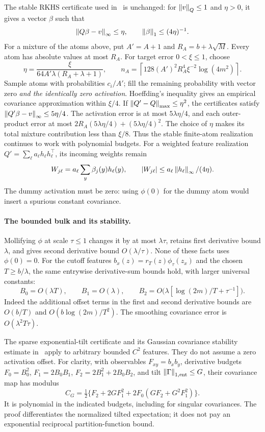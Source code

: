 The stable RKHS certificate used in~\cite{lipschitz} is unchanged: for
$\left\lVert v\right\rVert_Q\le1$ and $\eta>0$, it gives a vector $\beta$ such that
\[
 \left\lVert Q\beta-v\right\rVert_\infty\le\eta,\qquad
 \left\lVert\beta\right\rVert_1\le(4\eta)^{-1}.
\]
For a mixture of the atoms above, put $A'=A+1$ and
$R_A=b+\lambda\sqrt M$. Every atom has absolute values at most $R_A$.
For target error $0<\xi\le1$, choose
\[
 \eta=\frac{\xi}{64A'\lambda(R_A+\lambda+1)},\qquad
 n_A=\left\lceil128(A')^2R_A^4\xi^{-2}\log(4m^2)\right\rceil.
\]
Sample atoms with probabilities $c_i/A'$; fill the remaining probability
with vector zero \emph{and the identically zero activation}.
Hoeffding's inequality gives an empirical covariance approximation within
$\xi/4$. If $\left\lVert Q'-Q\right\rVert_{\max}\le\eta^2$, the certificates satisfy
$\left\lVert Q'\beta-v\right\rVert_\infty\le5\eta/4$. The activation error is at most
$5\lambda\eta/4$, and each outer-product error at most
$2R_A(5\lambda\eta/4)+(5\lambda\eta/4)^2$.
The choice of $\eta$ makes its total mixture contribution less than
$\xi/8$. Thus the stable finite-atom realization continues to work with
polynomial budgets. For a weighted feature realization
$Q'=\sum_\ell a_\ell h_\ell h_\ell^\top$, its incoming weights remain
\[
 W_{j\ell}=a_\ell\sum_y\beta_j(y)h_\ell(y),\qquad
 |W_{j\ell}|\le a_\ell\left\lVert h_\ell\right\rVert_\infty/(4\eta).
\]
The dummy activation must be zero: using $\phi(0)$ for the dummy atom
would insert a spurious constant covariance.

\paragraph{The bounded bulk and its stability.}
Mollifying $\phi$ at scale $\tau\le1$ changes it by at most $\lambda\tau$,
retains first derivative bound $\lambda$, and gives second derivative
bound $O(\lambda/\tau)$. None of these facts uses $\phi(0)=0$.
For the cutoff features $b_x(z)=r_T(z)\phi_\tau(z_x)$ and the chosen
$T\ge b/\lambda$, the same entrywise derivative-sum bounds hold, with
larger universal constants:
\[
 B_0=O(\lambda T),\qquad B_1=O(\lambda),\qquad
 B_2=O\bigl(\lambda[\log(2m)/T+\tau^{-1}]\bigr).
\]
Indeed the additional offset terms in the first and second derivative
bounds are $O(b/T)$ and $O(b\log(2m)/T^2)$. The smoothing covariance
error is $O(\lambda^2T\tau)$.

The sparse exponential-tilt certificate and its Gaussian covariance
stability estimate in~\cite{lipschitz} apply to arbitrary bounded $C^2$
features. They do not assume a zero activation offset. For clarity,
with observables $F_{xy}=b_xb_y$, derivative budgets
$F_0=B_0^2$, $F_1=2B_0B_1$, $F_2=2B_1^2+2B_0B_2$, and tilt
$\left\lVert\Gamma\right\rVert_{1,\rm ent}\le G$, their covariance map has modulus
\[
 C_G=\tfrac12\{F_2+2GF_1^2+2F_0(GF_2+G^2F_1^2)\}.
\]
It is polynomial in the indicated budgets, including for singular
covariances. The proof differentiates the normalized tilted expectation;
it does not pay an exponential reciprocal partition-function bound.

